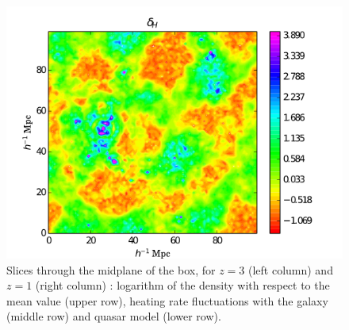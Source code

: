 \documentclass[twocolumns]{emulateapj}
\begin{document}
\begin{figure}
\includegraphics[width = .45\textwidth ]{data_delta_z1_qso4.png}

   \caption{ Slices through the midplane of the box, for $z=3$ (left column) and $z=1$ (right column) : logarithm of the density with respect to the mean value (upper row), heating rate fluctuations with the galaxy (middle row) and quasar model (lower row). }
  \label{fig:slice}
\end{figure}
\end{document}
